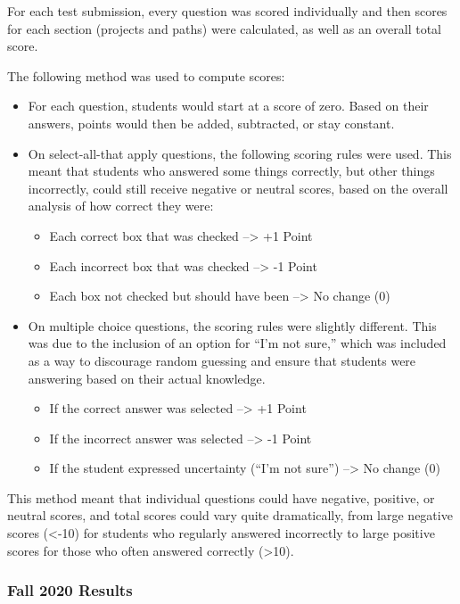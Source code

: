 \documentclass[12pt,twoside]{reedthesis}
\providecommand{\tightlist}{%
  \setlength{\itemsep}{0pt}\setlength{\parskip}{0pt}}
\begin{document}
For each test submission, every question was scored individually and then scores for each section (projects and paths) were calculated, as well as an overall total score.

The following method was used to compute scores:
\begin{itemize}
\item
  For each question, students would start at a score of zero. Based on their answers, points would then be added, subtracted, or stay constant.
\item
  On select-all-that apply questions, the following scoring rules were used. This meant that students who answered some things correctly, but other things incorrectly, could still receive negative or neutral scores, based on the overall analysis of how correct they were:
  \begin{itemize}
  \tightlist
  \item
    Each correct box that was checked --\textgreater{} +1 Point
  \item
    Each incorrect box that was checked --\textgreater{} -1 Point
  \item
    Each box not checked but should have been --\textgreater{} No change (0)
  \end{itemize}
\item
  On multiple choice questions, the scoring rules were slightly different. This was due to the inclusion of an option for ``I'm not sure,'' which was included as a way to discourage random guessing and ensure that students were answering based on their actual knowledge.
  \begin{itemize}
  \tightlist
  \item
    If the correct answer was selected --\textgreater{} +1 Point
  \item
    If the incorrect answer was selected --\textgreater{} -1 Point
  \item
    If the student expressed uncertainty (``I'm not sure'') --\textgreater{} No change (0)
  \end{itemize}
\end{itemize}
This method meant that individual questions could have negative, positive, or neutral scores, and total scores could vary quite dramatically, from large negative scores (\textless-10) for students who regularly answered incorrectly to large positive scores for those who often answered correctly (\textgreater10).

\hypertarget{fall-2020-results}{%
\subsubsection{Fall 2020 Results}\label{fall-2020-results}}
\end{document}
